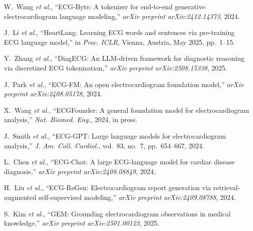 \documentclass[journal]{IEEEtran}
\begin{document}
\begin{thebibliography}{10}
W.~Wang \textit{et al.}, ``ECG-Byte: A tokenizer for end-to-end generative electrocardiogram language modeling,'' \textit{arXiv preprint arXiv:2412.14373}, 2024.

J.~Li \textit{et al.}, ``HeartLang: Learning ECG words and sentences via pre-training ECG language model,'' in \textit{Proc. ICLR}, Vienna, Austria, May 2025, pp.~1--15.

Y.~Zhang \textit{et al.}, ``DiagECG: An LLM-driven framework for diagnostic reasoning via discretized ECG tokenization,'' \textit{arXiv preprint arXiv:2508.15338}, 2025.

J.~Park \textit{et al.}, ``ECG-FM: An open electrocardiogram foundation model,'' \textit{arXiv preprint arXiv:2408.05178}, 2024.

X.~Wang \textit{et al.}, ``ECGFounder: A general foundation model for electrocardiogram analysis,'' \textit{Nat. Biomed. Eng.}, 2024, in press.

J.~Smith \textit{et al.}, ``ECG-GPT: Large language models for electrocardiogram analysis,'' \textit{J. Am. Coll. Cardiol.}, vol.~83, no.~7, pp.~654--667, 2024.

L.~Chen \textit{et al.}, ``ECG-Chat: A large ECG-language model for cardiac disease diagnosis,'' \textit{arXiv preprint arXiv:2408.08849}, 2024.

H.~Liu \textit{et al.}, ``ECG-ReGen: Electrocardiogram report generation via retrieval-augmented self-supervised modeling,'' \textit{arXiv preprint arXiv:2409.08788}, 2024.

S.~Kim \textit{et al.}, ``GEM: Grounding electrocardiogram observations in medical knowledge,'' \textit{arXiv preprint arXiv:2501.00123}, 2025.

\end{thebibliography}
\end{document}
